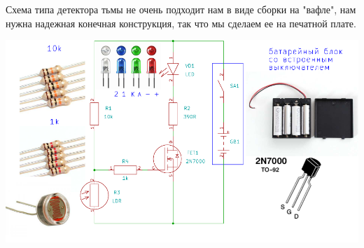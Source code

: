 
Схема типа детектора тьмы не очень подходит нам в виде сборки на "вафле", нам
нужна надежная конечная конструкция, так что мы сделаем ее на печатной плате.

\noindent
\includegraphics[height=0.5\textheight]{bcollis/ldr/final.pdf}
